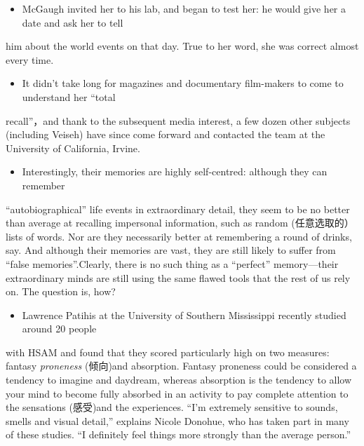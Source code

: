 \documentclass[UTF8,11pt]{ctexart}
\begin{document}
\begin{itemize}[leftmargin=2em,itemsep=.2em,topsep=.4em]\item[F.] McGaugh invited her to his lab, and began to test her: he would give her a date and ask her to tell
\end{itemize}

him about the world events on that day. True to her word, she was correct almost every time.


\begin{itemize}[leftmargin=2em,itemsep=.2em,topsep=.4em]\item[G.] It didn’t take long for magazines and documentary film-makers to come to understand her “total
\end{itemize}

recall”，and thank to the subsequent media interest, a few dozen other subjects (including Veiseh) have since come forward and contacted the team at the University of California, Irvine.


\begin{itemize}[leftmargin=2em,itemsep=.2em,topsep=.4em]\item[H.] Interestingly, their memories are highly self-centred: although they can remember
\end{itemize}

“autobiographical” life events in extraordinary detail, they seem to be no better than average at recalling impersonal information, such as random (任意选取的）lists of words. Nor are they necessarily better at remembering a round of drinks, say. And although their memories are vast, they are still likely to suffer from “false memories”.Clearly, there is no such thing as a “perfect” memory—their extraordinary minds are still using the same flawed tools that the rest of us rely on. The question is, how?


\begin{itemize}[leftmargin=2em,itemsep=.2em,topsep=.4em]\item[I.] Lawrence Patihis at the University of Southern Mississippi recently studied around 20 people
\end{itemize}

with HSAM and found that they scored particularly high on two measures: fantasy\textit{ proneness} (倾向)and absorption. Fantasy proneness could be considered a tendency to imagine and daydream, whereas absorption is the tendency to allow your mind to become fully absorbed in an activity to pay complete attention to the sensations (感受)and the experiences. “I’m extremely sensitive to sounds, smells and visual detail,” explains Nicole Donohue, who has taken part in many of these studies. “I definitely feel things more strongly than the average person.”
\end{document}
